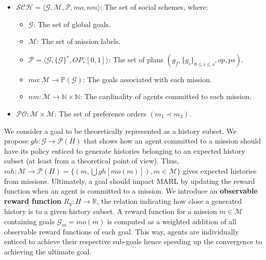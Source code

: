 \documentclass[sigconf,anonymous]{aamas}
\begin{document}
\begin{itemize}
  \item $\mathcal{SCH} = \langle \mathcal{G}, \mathcal{M}, \mathcal{P}, mo, nm \rangle$: The set of social schemes, where:
        \begin{itemize}
          \item $\mathcal{G}$: The set of global goals.
          \item $\mathcal{M}$: The set of mission labels.
          \item $\mathcal{P} = \langle \mathcal{G}, \{\mathcal{G}\}^s, OP, [0,1] \rangle$: The set of plans $(g_f, \{g_i\}_{0 \leq i \leq s}, op, ps)$.
          \item $mo: \mathcal{M} \rightarrow \mathbb{P}(\mathcal{G})$: The goals associated with each mission.
          \item $nm: \mathcal{M} \rightarrow \mathbb{N} \times \mathbb{N}$: The cardinality of agents committed to each mission.
        \end{itemize}
  \item $\mathcal{PO}: \mathcal{M} \times \mathcal{M}$: The set of preference orders $(m_1 \prec m_2)$.
\end{itemize}

We consider a goal to be theoretically represented as a history subset. We propose $gh: \mathcal{G} \rightarrow \mathcal{P}(H)$ that shows how an agent committed to a mission should have its policy enticed to generate histories belonging to an expected history subset (at least from a theoretical point of view). Thus, $mh: \mathcal{M} \rightarrow \mathcal{P}(H) = \{(m,\bigcup gh[mo(m)]), m \in \mathcal{M}\}$ gives expected histories from missions. Ultimately, a goal should impact MARL by updating the reward function when an agent is committed to a mission. We introduce an \textbf{observable reward function} $R_{g}: H \rightarrow \mathbb{R}$, the relation indicating how close a generated history is to a given history subset. A reward function for a mission $m \in \mathcal{M}$ containing goals $\mathcal{G}_{m} = mo(m)$ is computed as a weighted addition of all observable reward functions of each goal. This way, agents are individually enticed to achieve their respective sub-goals hence speeding up the convergence to achieving the ultimate goal.

%     
\end{document}
